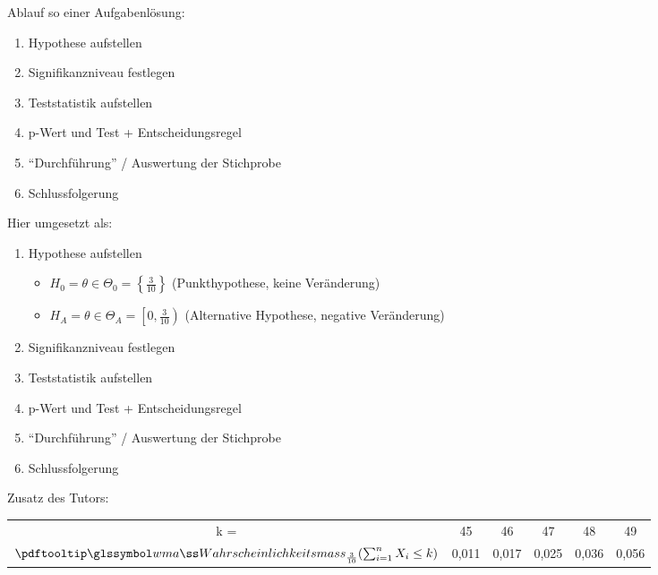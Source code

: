 Ablauf so einer Aufgabenlösung:
\begin{enumerate}
    \item Hypothese aufstellen
    \item Signifikanzniveau festlegen
    \item Teststatistik aufstellen
    \item  p-Wert und Test + Entscheidungsregel
    \item ``Durchführung'' / Auswertung der Stichprobe
    \item Schlussfolgerung
\end{enumerate}

Hier umgesetzt als:
\begin{enumerate}
    \item Hypothese aufstellen
    \begin{itemize}
        \item $H_0 = \theta \in \Theta_0 = \left\{  \frac{3}{10} \right\}$ (Punkthypothese, keine Veränderung)
        \item $H_A = \theta \in \Theta_A = \left[ 0, \frac{3}{10}  \right)$ (Alternative Hypothese, negative
        Veränderung)
    \end{itemize}
    \item Signifikanzniveau festlegen
    \item Teststatistik aufstellen
    \item p-Wert und Test + Entscheidungsregel
    \item ``Durchführung'' / Auswertung der Stichprobe
    \item Schlussfolgerung
\end{enumerate}

Zusatz des Tutors:
\begin{mytable}
    \begin{tabular}{cccccc}
        k = & 45 & 46 & 47 & 48 & 49 \\
        $\pe_{\frac{3}{10}} (\sumEN X_i \leq k)$ & 0,011 & 0,017 & 0,025 & 0,036 & 0,056 \\
    \end{tabular}
    \caption{Ab 49 Zustimmungen hätte man die Hypothese nicht verwefen müssen - ``48 und kleiner'' ist unser Verwerfungsbereich}
\end{mytable}

